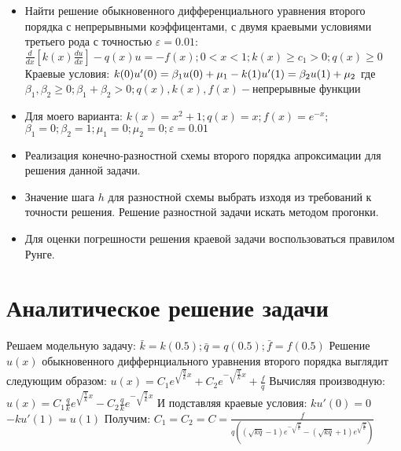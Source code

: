 \documentclass[a4paper,12pt,titlepage]{article}
\begin{document}
\begin{itemize}
\item Найти решение обыкновенного дифференциального уравнения второго порядка с непрерывными коэффицентами, с двумя краевыми условиями третьего рода с точностью $\varepsilon = 0.01$: \newline
$\frac{d}{dx}[k(x)\frac{du}{dx}]-q(x)u=-f(x); 0 < x < 1; k(x) \geq c_1 > 0; q(x) \geq 0$ \newline
Краевые условия:\newline
$k(0)u'(0)=\beta_1u(0)+\mu_1\newline -k(1)u'(1)=\beta_2u(1)+\mu_2 $ \newline
где $\beta_1, \beta_2 \geq 0; \beta_1 + \beta_2 > 0; q(x), k(x), f(x)-$непрерывные функции
\item Для моего варианта: \newline
$k(x)=x^2+1; q(x)=x; f(x)=e^{-x};$\newline
$\beta_1 = 0; \beta_2 = 1; \mu_1=0; \mu_2 = 0; \varepsilon = 0.01$\newline
\item Реализация конечно-разностной схемы второго порядка апроксимации для решения данной задачи.
\item Значение шага $h$ для разностной схемы выбрать изходя из требований к точности решения. Решение разностной задачи искать методом прогонки.
\item Для оценки погрешности решения краевой задачи воспользоваться правилом Рунге.
\end{itemize}

\newpage

\section{Аналитическое решение задачи}

Решаем модельную задачу: $\bar k = k(0.5); \bar q = q(0.5); \bar f = f(0.5)$ \newline
Решение $u(x)$ обыкновенного диффернциального уравнения второго порядка выглядит следующим образом: \newline
$u(x)=C_1e^{\sqrt{\frac{q}{k}}x}+C_2e^{-\sqrt{\frac{q}{k}}x}+\frac{f}{q}$\newline
Вычисляя производную: \newline
$u(x)=C_1\frac{q}{k}e^{\sqrt{\frac{q}{k}}x}-C_2\frac{q}{k}e^{-\sqrt{\frac{q}{k}}x}$\newline
И подставляя краевые условия:\newline
$ku'(0)=0$\newline
$-ku'(1)=u(1)$\newline
Получим:\newline
$C_1=C_2=C=\frac{f}{q((\sqrt{kq}-1)e^{-\sqrt{\frac{q}{k}}}-(\sqrt{kq}+1)e^{\sqrt{\frac{q}{k}}})}$\newline
\end{document}

